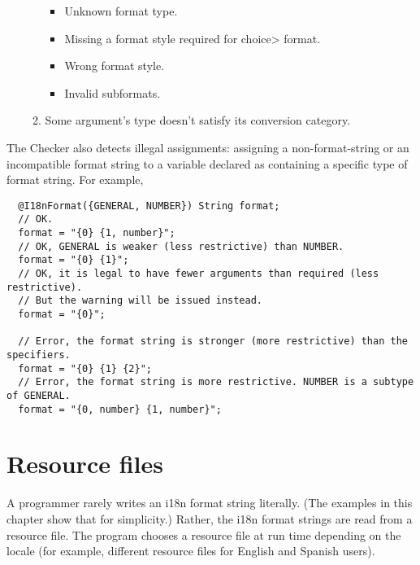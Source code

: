 \begin{enumerate}
\begin{enumerate}
\begin{itemize}
          \item Unknown format type.


          \item Missing a format style required for \<choice> format.


          \item Wrong format style.


          \item Invalid subformats.

        \end{itemize}

      \item Some argument's type doesn't satisfy its conversion category.

    \end{enumerate}
\end{enumerate}

The Checker also detects illegal assignments: assigning a non-format-string
or an incompatible format string to a variable declared as containing a
specific type of format string. For example,

\begin{Verbatim}
  @I18nFormat({GENERAL, NUMBER}) String format;
  // OK.
  format = "{0} {1, number}";
  // OK, GENERAL is weaker (less restrictive) than NUMBER.
  format = "{0} {1}";
  // OK, it is legal to have fewer arguments than required (less restrictive).
  // But the warning will be issued instead.
  format = "{0}";

  // Error, the format string is stronger (more restrictive) than the specifiers.
  format = "{0} {1} {2}";
  // Error, the format string is more restrictive. NUMBER is a subtype of GENERAL.
  format = "{0, number} {1, number}";
\end{Verbatim}

\section{Resource files\label{i18n-format-resource-files}}

A programmer rarely writes an i18n format string literally. (The examples
in this chapter show that for simplicity.) Rather, the i18n format strings are
read from a resource file.  The program chooses a resource file at run time
depending on the locale (for example, different resource files for English
and Spanish users).

